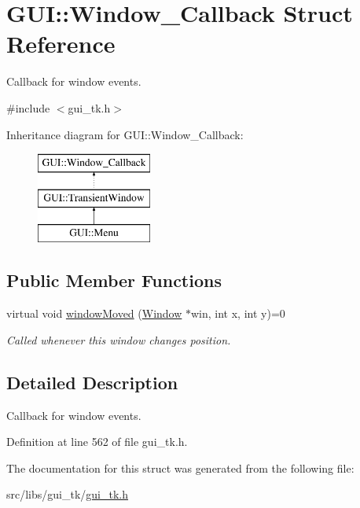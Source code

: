 \hypertarget{structGUI_1_1Window__Callback}{\section{G\-U\-I\-:\-:Window\-\_\-\-Callback Struct Reference}
\label{structGUI_1_1Window__Callback}
}


Callback for window events.  




{\ttfamily \#include $<$gui\-\_\-tk.\-h$>$}

Inheritance diagram for G\-U\-I\-:\-:Window\-\_\-\-Callback\-:\begin{figure}[H]
\begin{center}
\leavevmode
\includegraphics[height=3.000000cm]{structGUI_1_1Window__Callback}
\end{center}
\end{figure}
\subsection*{Public Member Functions}
\begin{DoxyCompactItemize}
\item 
\hypertarget{structGUI_1_1Window__Callback_a65e7bae539620c03486613128701b96f}{virtual void \hyperlink{structGUI_1_1Window__Callback_a65e7bae539620c03486613128701b96f}{window\-Moved} (\hyperlink{classGUI_1_1Window}{Window} $\ast$win, int x, int y)=0}\label{structGUI_1_1Window__Callback_a65e7bae539620c03486613128701b96f}

\begin{DoxyCompactList}\small\item\em Called whenever this window changes position. \end{DoxyCompactList}\end{DoxyCompactItemize}


\subsection{Detailed Description}
Callback for window events. 

Definition at line 562 of file gui\-\_\-tk.\-h.



The documentation for this struct was generated from the following file\-:\begin{DoxyCompactItemize}
\item 
src/libs/gui\-\_\-tk/\hyperlink{gui__tk_8h}{gui\-\_\-tk.\-h}\end{DoxyCompactItemize}
